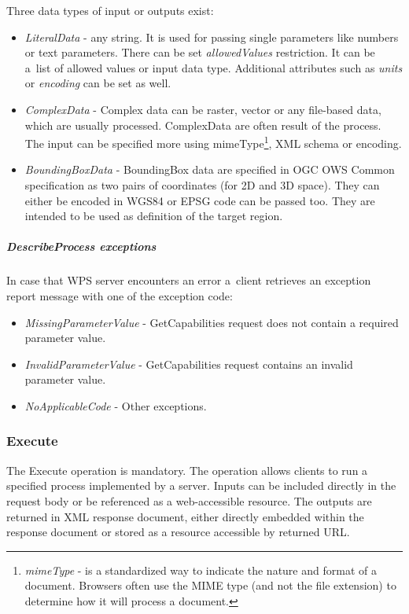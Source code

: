 \noindent
Three data types of input or outputs exist:
\begin{itemize}
\item\textit{LiteralData} - any string. It is used for passing single parameters like numbers or text parameters. There can be set
\textit{allowedValues} restriction. It can be a~list of allowed values or input data type. Additional attributes such as \textit{units}
or \textit{encoding} can be set as well. 
\item\textit{ComplexData} - Complex data can be raster, vector or any file-based data, which are usually processed. ComplexData
are often result of the process. The input can be specified more using 
mimeType\footnote{\textit{mimeType} - is a standardized way to indicate the nature and format of a document. Browsers often use the MIME type (and not the file extension) to determine how it will process a document.}, XML schema or encoding.
\item\textit{BoundingBoxData} - BoundingBox data are specified in OGC OWS Common specification as two pairs of 
coordinates (for 2D and 3D space). They can either be encoded in WGS84 or EPSG code can be passed too. They are intended 
to be used as definition of the target region.
\end{itemize}

\subparagraph{DescribeProcess exceptions}
In case that WPS server encounters an error a~client retrieves an exception report message with one of the exception code:
\begin{itemize}
\item\textit{MissingParameterValue} - GetCapabilities request does not contain a required parameter value.
\item\textit{InvalidParameterValue} - GetCapabilities request contains an invalid parameter value.
\item\textit{NoApplicableCode} - Other exceptions.
\end{itemize}

\subsubsection{Execute}
The Execute operation is mandatory. The operation allows clients to run a specified process implemented by a server.
Inputs can be included directly in the request body or be referenced as a web-accessible resource. The outputs are 
returned in XML response document, either directly embedded within the response document or stored as a resource 
accessible by returned URL.

